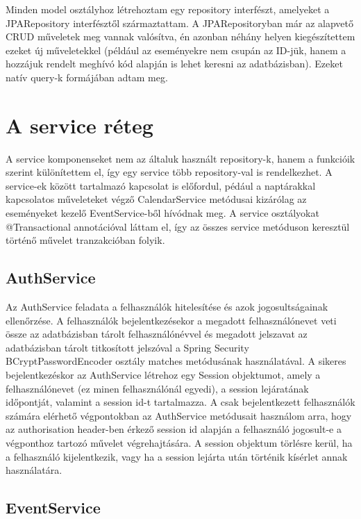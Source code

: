 \documentclass[a4paper,12pt]{report}
\theoremstyle{definition}
\theoremstyle{remark}
\begin{document}
Minden model osztályhoz létrehoztam egy repository interfészt, amelyeket a JPARepository interfésztől származtattam. A JPARepositoryban már az alapvető CRUD műveletek meg vannak valósítva, én azonban néhány helyen kiegészítettem ezeket új műveletekkel (például az eseményekre nem csupán az ID-jük, hanem a hozzájuk rendelt meghívó kód alapján is lehet keresni az adatbázisban). Ezeket natív query-k formájában adtam meg.

\section{A service réteg}

A service komponenseket nem az általuk használt repository-k, hanem a funkcióik szerint különítettem el, így egy service több repository-val is rendelkezhet. A service-ek között tartalmazó kapcsolat is előfordul, pédául a naptárakkal kapcsolatos műveleteket végző CalendarService metódusai kizárólag az eseményeket kezelő EventService-ből hívódnak meg. A service osztályokat @Transactional annotációval láttam el, így az összes service metóduson keresztül történő művelet tranzakcióban folyik.

\subsection{AuthService}

Az AuthService feladata a felhasználók hitelesítése és azok jogosultságainak ellenőrzése. A felhasználók bejelentkezésekor a megadott felhasználónevet veti össze az adatbázisban tárolt felhasználónévvel és megadott jelszavat az adatbázisban tárolt titkosított jelszóval a Spring Security BCryptPasswordEncoder osztály matches metódusának használatával. A sikeres bejelentkezéskor az AuthService létrehoz egy Session objektumot, amely a felhasználónevet (ez minen felhasználónál egyedi), a session lejáratának időpontját, valamint a session id-t tartalmazza.  A csak bejelentkezett felhasználók számára elérhető végpontokban az AuthService metódusait használom arra, hogy az authorisation header-ben érkező session id alapján a felhasználó jogosult-e a végponthoz tartozó művelet végrehajtására. A session objektum törlésre kerül, ha a felhasználó kijelentkezik, vagy ha a session lejárta után történik kísérlet annak használatára.

\subsection{EventService}
\end{document}
